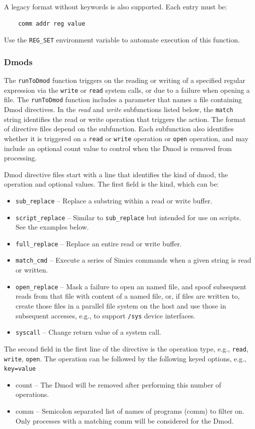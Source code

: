 \documentclass[titlepage]{article}
\begin{document}
A legacy format without keywords is also supported.  Each entry must be:
\begin{verbatim}
    comm addr reg value
\end{verbatim}

Use the {\tt REG\_SET} environment variable to automate execution of this function.

\subsubsection{Dmods}
The {\tt runToDmod} function triggers on the reading or writing of a specified
regular expression via the {\tt write} or {\tt read} system calls, or due to a failure
when opening a file.    
The {\tt runToDmod} function includes a parameter that names a file containing
Dmod directives.  In the \textit{read} and \textit{write} subfunctions listed
below, the {\tt match} string identifies the read or write operation that triggers the action. 
The format of directive files depend on the subfunction.  Each subfunction also identifies whether it is
triggered on a {\tt read} or {\tt write} operation or {\tt open} operation, and may include an optional count value to control when
the Dmod is removed from processing.

Dmod directive files start with a line that identifies the kind of dmod, the operation and optional values.
The first field is the kind, which can be:
\begin {itemize}
\item {\tt sub\_replace} -- Replace a substring within a read or write buffer.
\item {\tt script\_replace} -- Similar to {\tt sub\_replace} but intended for use on scripts.  See the examples below.
\item {\tt full\_replace} -- Replace an entire read or write buffer.
\item {\tt match\_cmd} -- Execute a series of Simics commands when a given string is read or written.
\item {\tt open\_replace} -- Mask a failure to open an named file, and spoof subsequent reads from that file with content of a named file, or, if files are written to, create those files in a parallel file system on the host and use those in subsequent accesses, e.g., to
support {\tt /sys} device interfaces.
\item {\tt syscall} -- Change return value of a system call.
\end{itemize}
The second field in the first line of the directive is the operation type, e.g., {\tt read}, {\tt write}, {\tt open}.
The operation can be followed by the following keyed options, e.g., {\tt key=value}
\begin{itemize}
\item count -- The Dmod will be removed after performing this number of operations. 
\item comm -- Semicolon separated list of names of programs (comm) to filter on.  Only processes with a matching comm will be considered for the Dmod.
\end{itemize}
\end{document}
